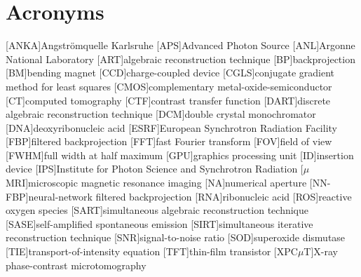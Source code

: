 \documentclass[
twoside,
openright,
titlepage,
numbers=noenddot,
headinclude,
fleqn,
a4paper,
footinclude=true,
cleardoublepage=empty,
abstractoff,
BCOR=5mm,
paper=a4,
fontsize=11pt,
british,ngerman,american,
]{scrreprt}
\begin{document}
\chapter*{Acronyms}
\manualmark
{}
{}
{}
\begin{acronym}
  \setlength{\itemsep}{-\parsep}%
  [ANKA]{Angströmquelle Karlsruhe}
  [APS]{Advanced Photon Source}
  [ANL]{Argonne National Laboratory}
  [ART]{algebraic reconstruction technique}
  [BP]{backprojection}
  [BM]{bending magnet}
  [CCD]{charge-coupled device}
  [CGLS]{conjugate gradient method for least squares}
  [CMOS]{complementary metal-oxide-semiconductor}
  [CT]{computed tomography}
  [CTF]{contrast transfer function}
  [DART]{discrete algebraic reconstruction technique}
  [DCM]{double crystal monochromator}
  [DNA]{deoxyribonucleic acid}
  [ESRF]{European Synchrotron Radiation Facility}
  [FBP]{filtered backprojection}
  [FFT]{fast Fourier transform}
  [FOV]{field of view}
  [FWHM]{full width at half maximum} 
  [GPU]{graphics processing unit}
  [ID]{insertion device}
  [IPS]{Institute for Photon Science and Synchrotron Radiation}
  [$\mu$MRI]{microscopic magnetic resonance imaging}
  [NA]{numerical aperture}
  [NN-FBP]{neural-network filtered backprojection}
  [RNA]{ribonucleic acid}
  [ROS]{reactive oxygen species}
  [SART]{simultaneous algebraic reconstruction technique}
  [SASE]{self-amplified spontaneous emission}
  [SIRT]{simultaneous iterative reconstruction technique}
  [SNR]{signal-to-noise ratio}
  [SOD]{superoxide dismutase}
  [TIE]{transport-of-intensity equation}
  [TFT]{thin-film transistor}
  [XPC$\mu$T]{X-ray phase-contrast microtomography}
\end{acronym}
\cleardoublepage
\end{document}
